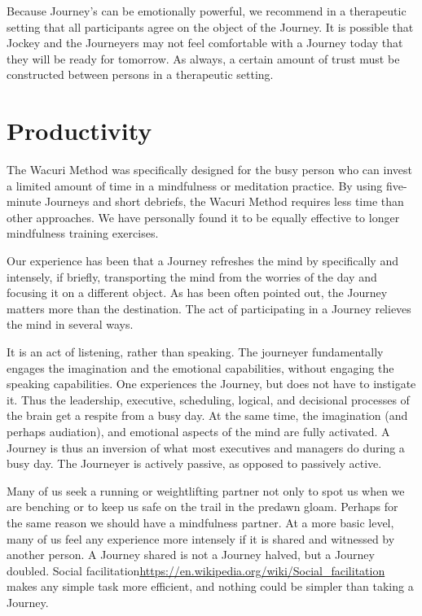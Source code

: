 \documentclass[12pt]{book}
\begin{document}
Because Journey's can be emotionally powerful, we recommend in a
therapeutic setting that all participants agree on the object of the
Journey. It is possible that Jockey and the Journeyers may not feel
comfortable with a Journey today that they will be ready for
tomorrow. As always, a certain amount of trust must be constructed
between persons in a therapeutic setting.

\section{Productivity}

The Wacuri Method was specifically designed for the busy person who
can invest a limited amount of time in a mindfulness or meditation
practice. By using five-minute Journeys and short debriefs, the Wacuri
Method requires less time than other approaches. We have personally
found it to be equally effective to longer mindfulness training
exercises.

Our experience has been that a Journey refreshes the mind by
specifically and intensely, if briefly, transporting the mind from the
worries of the day and focusing it on a different object. As has been
often pointed out, the Journey matters more than the destination. The
act of participating in a Journey relieves the mind in several ways.

It is an act of listening, rather than speaking. The journeyer
fundamentally engages the imagination and the emotional capabilities,
without engaging the speaking capabilities. One experiences the
Journey, but does not have to instigate it.  Thus the leadership,
executive, scheduling, logical, and decisional processes of the brain get a respite
from a busy day. At the same time, the imagination (and perhaps
audiation), and emotional aspects of the mind are fully activated. A
Journey is thus an inversion of what most executives and managers do
during a busy day. The Journeyer is actively passive, as opposed to passively active.

Many of us seek a running or weightlifting partner not only to spot
us when we are benching or to keep us safe on the trail in the
predawn gloam.  Perhaps for the same reason we should have a
mindfulness partner.  At a more basic level, many of us feel any
experience more intensely if it is shared and witnessed by another
person. A Journey shared is not a Journey halved, but a Journey
doubled.  Social facilitation\url{https://en.wikipedia.org/wiki/Social_facilitation} makes any simple task more efficient, and
nothing could be simpler than taking a Journey.
\end{document}

